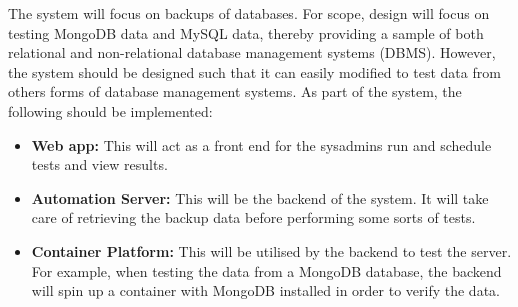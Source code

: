 \noindent The system will focus on backups of databases. For scope, design will focus on testing MongoDB data and MySQL data, thereby providing a sample of both relational and non-relational database management systems (DBMS). However, the system should be designed such that it can easily modified to test data from others forms of database management systems. As part of the system, the following should be implemented:

\begin{itemize}
	\item \textbf{Web app:} This will act as a front end for the sysadmins run and schedule tests and view results.
	\item \textbf{Automation Server:} This will be the backend of the system. It will take care of retrieving the backup data before performing some sorts of tests.
	\item \textbf{Container Platform:} This will be utilised by the backend to test the server. For example, when testing the data from a MongoDB database, the backend will spin up a container with MongoDB installed in order to verify the data. 
\end{itemize}